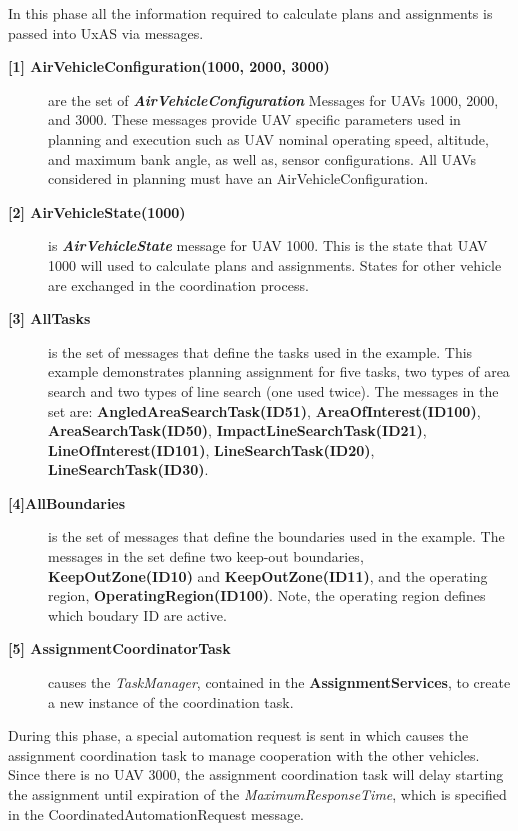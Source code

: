 In this phase all the information required to calculate plans and assignments is passed into UxAS via messages.
\begin{description}
	\item[\textbf{[1] AirVehicleConfiguration(1000, 2000, 3000)}] are the set of \textbf{\textit{AirVehicleConfiguration}} Messages for UAVs 1000, 2000, and 3000. These messages provide UAV specific parameters used in planning and execution such as UAV nominal  operating speed, altitude, and maximum bank angle, as well as, sensor configurations. All UAVs considered in planning must have an AirVehicleConfiguration.
	\item[\textbf{[2] AirVehicleState(1000)}] is \textbf{\textit{AirVehicleState}} message for UAV 1000. This is the state that UAV 1000 will used to calculate plans and assignments. States for other vehicle are exchanged in the coordination process.
	\item[\textbf{[3] AllTasks} ] is the set of messages that define the tasks used in the example. This example demonstrates planning assignment for five tasks, two types of area search and two types of line search (one used twice). The messages in the set are: \textbf{AngledAreaSearchTask(ID51)}, \textbf{AreaOfInterest(ID100)}, \textbf{AreaSearchTask(ID50)}, \textbf{ImpactLineSearchTask(ID21)}, \textbf{LineOfInterest(ID101)}, \textbf{LineSearchTask(ID20)}, \textbf{LineSearchTask(ID30)}.
	\item[\textbf{[4]AllBoundaries}] is the set of messages that define the boundaries used in the example. The messages in the set define two keep-out boundaries,  \textbf{KeepOutZone(ID10)} and \textbf{KeepOutZone(ID11)}, and the operating region, \textbf{OperatingRegion(ID100)}. Note, the operating region defines which boudary ID are active.
	\item[\textbf{[5] AssignmentCoordinatorTask}] causes the \textit{TaskManager}, contained in the \textbf{AssignmentServices}, to create a new instance of the coordination task.

\end{description}
%
%
%
During this phase, a special automation request is sent in which causes the assignment coordination task to manage cooperation with the other vehicles. Since there is no UAV 3000, the assignment coordination task will delay starting the assignment until expiration of the \textit{MaximumResponseTime}, which is specified in the CoordinatedAutomationRequest message.
